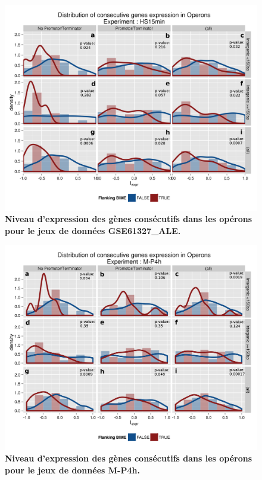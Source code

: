 \documentclass[12pt,a4paper]{report}
\begin{document}
\chapter{}
\label{annexeOperon}
\begin{figure}[!h]
\centerline{\includegraphics[scale=0.7]{figures/supData/genesOperon_histoDens_HS15.png}}
\caption{\textbf{Niveau d'expression des gènes consécutifs dans les opérons pour le jeux de données GSE61327\_ALE.}}
\end{figure}

\begin{figure}[!h]
\centerline{\includegraphics[scale=0.7]{figures/supData/genesOperon_histoDens_M-P4h.png}}
\caption{\textbf{Niveau d'expression des gènes consécutifs dans les opérons pour le jeux de données M-P4h.}}
\end{figure}
\end{document}
